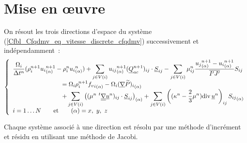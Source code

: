 \section*{Mise en \oe uvre}
On résout les trois directions d'espace du système
(\ref{Cfbl_Cfqdmv_eq_vitesse_discrete_cfqdmv}) successivement et indépendamment~:
\begin{equation}\label{Cfbl_Cfqdmv_eq_vitesse_finale_cfqdmv}
\left\{\begin{array}{l}
\displaystyle\frac{\Omega_i}{\Delta t^n}
(\rho_i^{n+1}{u_i}_{(\alpha)}^{n+1}-\rho_i^n{u_i}_{(\alpha)}^n)
+ \displaystyle\sum\limits_{j\in V(i)}
{u_{ij}}_{(\alpha)}^{n+1}(\vect{Q}_{ac}^{n+1})_{ij}\cdot\vect{S}_{ij}
- \displaystyle\sum\limits_{j\in V(i)}
\mu_{ij}^n\frac{{u_j}_{(\alpha)}^{n+1}-{u_i}_{(\alpha)}^{n+1}}{\overline{I'J'}}S_{ij}\\
\qquad\qquad\qquad\qquad= \Omega_i\rho_i^{n+1} {{f_v}_i}_{(\alpha)}
- \Omega_i{(\gradv{\widetilde{P}})_{i}}_{(\alpha)}\\
\qquad\qquad\qquad\qquad + \displaystyle\sum\limits_{j\in V(i)}
\left((\mu^n\ ^t\gradt{\vect{u}^n})_{ij}\cdot\vect{S}_{ij}\right)_{(\alpha)}
 + \displaystyle\sum\limits_{j\in V(i)} \left((\kappa^n-\frac{2}{3}\mu^n)
\divs{\vect{u}^n}\right)_{ij}{S_{ij}}_{(\alpha)}\\
i = 1\ldots N \qquad \text{et} \qquad (\alpha) = x,\ y,\ z\\
\end{array}\right.
\end{equation}

Chaque système associé à une direction est résolu par une méthode
d'incrément et résidu en utilisant une méthode de Jacobi.




